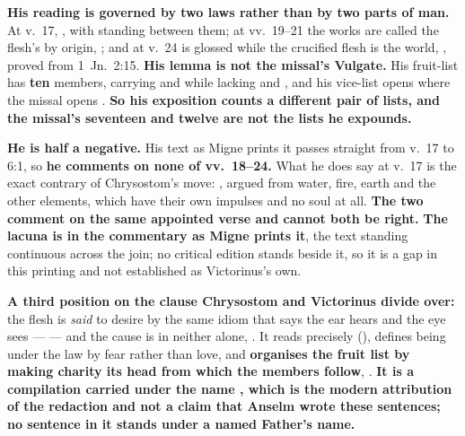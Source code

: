 \begin{witnessnote}
 \textbf{His
reading is governed by two laws rather than by two parts of man.} At v.~17,
, with  standing between them; at vv.~19--21 the works are called the flesh's by
origin, ; and at v.~24
 is glossed  while the
crucified flesh is the world, ,
proved from 1~Jn.\ 2:15. \textbf{His lemma is not the missal's Vulgate.} His fruit-list
has \textbf{ten} members, carrying  and  while
lacking  and , and his vice-list opens
 where the missal opens
. \textbf{So his exposition
counts a different pair of lists, and the missal's seventeen and twelve are not
the lists he expounds.}
\end{witnessnote}

\begin{witnessnote}
 \textbf{He is half a negative.} His
text as Migne prints it passes straight from v.~17 to 6:1, so \textbf{he
comments on none of vv.~18--24.} What he does say at v.~17 is the exact contrary
of Chrysostom's move: , argued from water, fire, earth and the other
elements, which have their own impulses and no soul at all. \textbf{The two
comment on the same appointed verse and cannot both be right.} \textbf{The lacuna
is in the commentary as Migne prints it}, the text standing continuous across the join; no critical edition stands
beside it, so it is a gap in this printing and not established as Victorinus's
own.
\end{witnessnote}

\begin{witnessnote}
 \textbf{A third position on the clause Chrysostom and Victorinus divide
over:} the flesh is \emph{said} to desire by the same idiom that says the ear
hears and the eye sees ---  --- and the cause is in neither alone, . It reads  precisely (), defines
being under the law by fear rather than love, and \textbf{organises the fruit
list by making charity its head from which the members follow},
. \textbf{It is a compilation carried
under the name , which
is the modern attribution of the redaction and not a claim that Anselm wrote
these sentences; no sentence in it stands under a named Father's name.}
\end{witnessnote}

